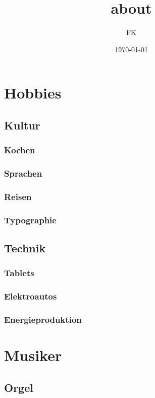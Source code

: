 \documentclass[11pt]{article}
\author{FK}
\date{\today}
\title{about}
\begin{document}
\maketitle
\tableofcontents


\section{Hobbies}
\label{sec-1}
\subsection{Kultur}
\label{sec-1-1}
\subsubsection{Kochen}
\label{sec-1-1-1}
\subsubsection{Sprachen}
\label{sec-1-1-2}
\subsubsection{Reisen}
\label{sec-1-1-3}
\subsubsection{Typographie}
\label{sec-1-1-4}

\subsection{Technik}
\label{sec-1-2}
\subsubsection{Tablets}
\label{sec-1-2-1}
\subsubsection{Elektroautos}
\label{sec-1-2-2}
\subsubsection{Energieproduktion}
\label{sec-1-2-3}

\section{Musiker}
\label{sec-2}
\subsection{Orgel}
\label{sec-2-1}
\end{document}
